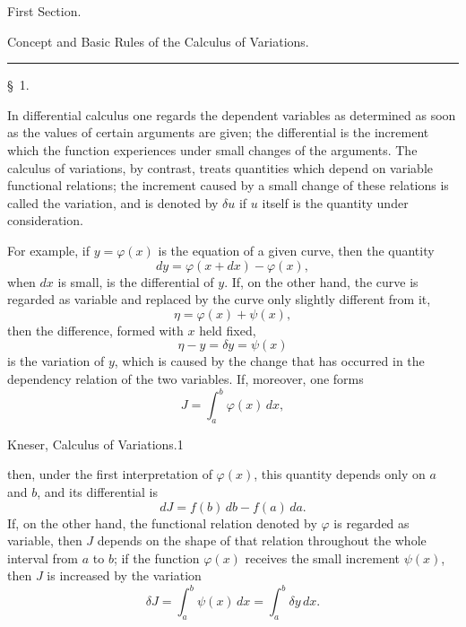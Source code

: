 \documentclass[11pt,a4paper,leqno]{article}
\begin{document}
\begin{center}
{\large First Section.}\par
\vspace{4mm}
{\Large Concept and Basic Rules of the Calculus of Variations.}\par
\vspace{3mm}\rule{28mm}{0.4pt}\par
\vspace{4mm}
{\large \S~1.}\par
\end{center}

In differential calculus one regards the dependent variables as determined as soon as the values of certain arguments are given; the differential is the increment which the function experiences under small changes of the arguments. The calculus of variations, by contrast, treats quantities which depend on variable functional relations; the increment caused by a small change of these relations is called the variation, and is denoted by $\delta u$ if $u$ itself is the quantity under consideration.

For example, if $y=\varphi(x)$ is the equation of a given curve, then the quantity
\[
 dy=\varphi(x+dx)-\varphi(x),
\]
when $dx$ is small, is the differential of $y$. If, on the other hand, the curve is regarded as variable and replaced by the curve only slightly different from it,
\[
 \eta=\varphi(x)+\psi(x),
\]
then the difference, formed with $x$ held fixed,
\[
 \eta-y=\delta y=\psi(x)
\]
is the variation of $y$, which is caused by the change that has occurred in the dependency relation of the two variables. If, moreover, one forms
\[
 J=\int_a^b \varphi(x)\,dx,
\]
{\footnotesize\noindent Kneser, Calculus of Variations.\hfill 1\par}

then, under the first interpretation of $\varphi(x)$, this quantity depends only on $a$ and $b$, and its differential is
\[
 dJ=f(b)\,db-f(a)\,da.
\]
If, on the other hand, the functional relation denoted by $\varphi$ is regarded as variable, then $J$ depends on the shape of that relation throughout the whole interval from $a$ to $b$; if the function $\varphi(x)$ receives the small increment $\psi(x)$, then $J$ is increased by the variation
\[
 \delta J=\int_a^b \psi(x)\,dx=\int_a^b \delta y\,dx.
\]
\end{document}
